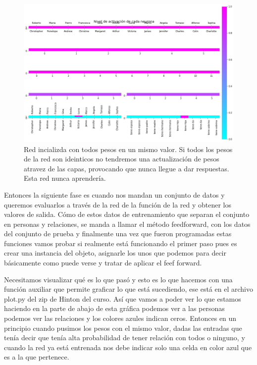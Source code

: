   \begin{figure}[H]
   \centering
   \includegraphics[scale=.5]{../Figuras/Hinton/r1.png}
   \caption{Red incializda con todos pesos en un mismo valor. Si todos los pesos de la red son ideinticos no tendremos una actualización de pesos atravez de las capas, provocando que nunca llegue a dar respuestas. Esta red nunca aprendería.}
  \label{fig:r1}
  \end{figure}


Entonces la siguiente fase es cuando nos mandan un conjunto de datos y queremos evaluarlos a través de la red de la función de la red y obtener los valores de salida. Cómo de estos datos de entrenamiento que separan el conjunto en personas y relaciones, se manda a llamar el método feedforward, con los datos del conjunto de prueba y finalmente  una vez que fueron programadas estas funciones vamos probar si realmente está funcionando el primer paso pues es crear una instancia del objeto, asignarle los unos que podemos para decir básicamente como puede verse y tratar de aplicar el feef forward. 

 Necesitamos visualizar qué es lo que pasó y esto es lo que hacemos con una función auxiliar que permite graficar lo que está sucediendo, ese está en el archivo plot.py del zip de Hinton del curso. Así que vamos a poder ver lo que estamos haciendo en la parte de abajo de esta gráfica  podemos ver a las personas podemos ver las relaciones y los colores azules indican ceros. Entonces en un principio cuando pusimos los pesos con el mismo valor, dadas las entradas que tenía decir que tenía alta probabilidad de tener relación con todos o ninguno, y cuando la red ya está entrenada nos debe indicar solo una celda en color azul que es a la que pertenece.
 
